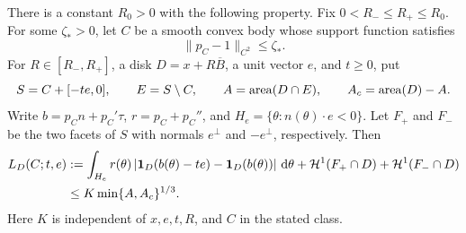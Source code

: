 \begin{lemma}
\label{lem:effective-collision-boundary}
There is a constant $R_0>0$ with the following property. Fix
$0<R_-\le R_+\le R_0$. For some $\zeta_*>0$, let $C$ be a smooth convex
body whose support function satisfies
\[
                         \|p_C-1\|_{C^2}\le\zeta_*.
\]
For $R\in[R_-,R_+]$, a disk $D=x+R\overline B$, a unit vector $e$,
and $t\ge0$, put
\[
 S=C+[-te,0],\qquad E=S\setminus C,\qquad
 A=\operatorname{area}(D\cap E),\qquad A_c=\operatorname{area}(D)-A.
\]
Write $b=p_Cn+p_C'\tau$, $r=p_C+p_C''$, and
$H_e=\{\theta:n(\theta)\cdot e<0\}$. Let $F_+$ and $F_-$ be the
two facets of $S$ with normals $e^\perp$ and $-e^\perp$, respectively.
Then
\begin{align}
 L_D(C;t,e)
 &: =\int_{H_e}r(\theta)
       \left|\mathbf 1_D(b(\theta)-te)-\mathbf 1_D(b(\theta))\right|\,\mathrm d\theta
       +\mathcal H^1(F_+\cap D)+\mathcal H^1(F_-\cap D)
       \label{eq:effective-boundary-length}\\
 &\le K\min\{A,A_c\}^{1/3}.\label{eq:effective-boundary-area}
\end{align}
Here $K$ is independent of $x,e,t,R$, and $C$ in the stated class.
\end{lemma}
